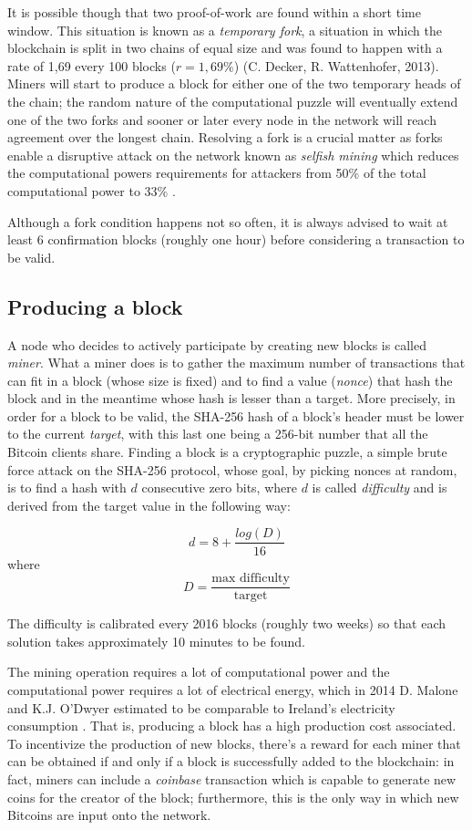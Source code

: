 		It is possible though that two proof-of-work are found within a short time window. This situation is known as a \textit{temporary fork}, a situation in which the blockchain is split in two chains of equal size and was found to happen with a rate of 1,69 every 100 blocks (\(r = 1,69\%\)) (C. Decker, R. Wattenhofer, 2013). Miners will start to produce a block for either one of the two temporary heads of the chain; the random nature of the computational puzzle will eventually extend one of the two forks and sooner or later every node in the network will reach agreement over the longest chain. Resolving a fork is a crucial matter as forks enable a disruptive attack on the network known as \textit{selfish mining} which reduces the computational powers requirements for attackers from 50\% of the total computational power to 33\% \cite{Eyal2013}. 
		
		Although a fork condition happens not so often, it is always advised to wait at least 6 confirmation blocks (roughly one hour) before considering a transaction to be valid.
		
		\subsection{Producing a block}
		
		A node who decides to actively participate by creating new blocks is called \textit{miner}. What a miner does is to gather the maximum number of transactions that can fit in a block (whose size is fixed) and to find a value (\textit{nonce}) that hash the block and in the meantime whose hash is lesser than a target. More precisely, in order for a block to be valid, the SHA-256 hash of a block's header must be lower to the current \textit{target}, with this last one being a 256-bit number that all the Bitcoin clients share. Finding a block is a cryptographic puzzle, a simple brute force attack on the SHA-256 protocol, whose goal, by picking nonces at random, is to find a hash with \(d\) consecutive zero bits, where \(d\) is called \textit{difficulty} and is derived from the target value in the following way:
		
		\newpage
	
		\[ d = 8 + \frac{log(D)}{16}\] 
		where
		\[D = \frac{\text{max difficulty}}{\text{target}}\]
		
		The difficulty is calibrated every 2016 blocks (roughly two weeks) so that each solution takes approximately 10 minutes to be found. 
		
		The mining operation requires a lot of computational power and the computational power requires a lot of electrical energy, which in 2014 D. Malone and  K.J. O'Dwyer estimated to be comparable to Ireland's electricity consumption \cite{Malone2014}. That is, producing a block has a high production cost associated. To incentivize the production of new blocks, there's a reward for each miner that can be obtained if and only if a block is successfully added to the blockchain: in fact, miners can include a \textit{coinbase} transaction which is capable to generate new coins for the creator of the block; furthermore, this is the only way in which new Bitcoins are input onto the network.
		
